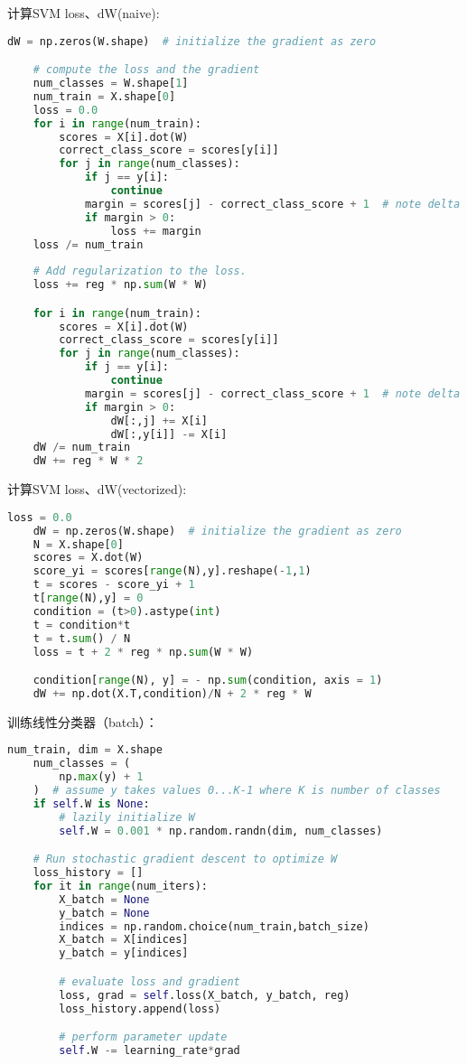 \documentclass[a4paper]{article}
\begin{document}
计算SVM loss、dW(naive):
\begin{lstlisting}[language=Python, caption=SVM(naive)]
    dW = np.zeros(W.shape)  # initialize the gradient as zero

    # compute the loss and the gradient
    num_classes = W.shape[1]
    num_train = X.shape[0]
    loss = 0.0
    for i in range(num_train):
        scores = X[i].dot(W)
        correct_class_score = scores[y[i]]
        for j in range(num_classes):
            if j == y[i]:
                continue
            margin = scores[j] - correct_class_score + 1  # note delta = 1
            if margin > 0:
                loss += margin
    loss /= num_train
    
    # Add regularization to the loss.
    loss += reg * np.sum(W * W)

    for i in range(num_train):
        scores = X[i].dot(W)
        correct_class_score = scores[y[i]]
        for j in range(num_classes):
            if j == y[i]:
                continue
            margin = scores[j] - correct_class_score + 1  # note delta = 1
            if margin > 0:
                dW[:,j] += X[i]
                dW[:,y[i]] -= X[i]
    dW /= num_train 
    dW += reg * W * 2 
\end{lstlisting}

计算SVM loss、dW(vectorized):
\begin{lstlisting}[language=Python, caption=SVM(vectorized)]
    loss = 0.0
    dW = np.zeros(W.shape)  # initialize the gradient as zero
    N = X.shape[0]
    scores = X.dot(W)
    score_yi = scores[range(N),y].reshape(-1,1)
    t = scores - score_yi + 1
    t[range(N),y] = 0
    condition = (t>0).astype(int)
    t = condition*t
    t = t.sum() / N
    loss = t + 2 * reg * np.sum(W * W)

    condition[range(N), y] = - np.sum(condition, axis = 1)
    dW += np.dot(X.T,condition)/N + 2 * reg * W
\end{lstlisting}



训练线性分类器（batch）：
\begin{lstlisting}[language=Python, caption=训练线性分类器]
    num_train, dim = X.shape
    num_classes = (
        np.max(y) + 1
    )  # assume y takes values 0...K-1 where K is number of classes
    if self.W is None:
        # lazily initialize W
        self.W = 0.001 * np.random.randn(dim, num_classes)

    # Run stochastic gradient descent to optimize W
    loss_history = []
    for it in range(num_iters):
        X_batch = None
        y_batch = None
        indices = np.random.choice(num_train,batch_size)
        X_batch = X[indices]
        y_batch = y[indices]

        # evaluate loss and gradient
        loss, grad = self.loss(X_batch, y_batch, reg)
        loss_history.append(loss)

        # perform parameter update
        self.W -= learning_rate*grad
\end{lstlisting}
\end{document}
